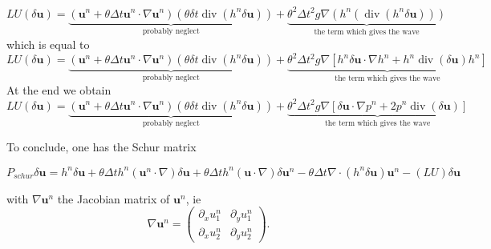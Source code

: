 \documentclass[a4paper, 11pt]{article}
\begin{document}
\begin{equation*}
LU(\delta \boldsymbol{u})=\underbrace{\left(\boldsymbol{u}^n+\theta \Delta t \boldsymbol{u}^n\cdot \nabla \boldsymbol{u}^n \right)\left(\theta \delta t \operatorname{div}(h^n \delta \boldsymbol{u})\right)}_\textrm{probably neglect}
+\underbrace{\theta^2 \Delta t^2 g\nabla\left( h^n\left(\operatorname{div}(h^n\delta  \boldsymbol{u})\right)\right)}_\textrm{the term which gives the wave}
\end{equation*}
which is equal to
\begin{equation*}
LU(\delta \boldsymbol{u})=\underbrace{\left(\boldsymbol{u}^n+\theta \Delta t \boldsymbol{u}^n\cdot \nabla \boldsymbol{u}^n \right)\left(\theta \delta t \operatorname{div}(h^n \delta \boldsymbol{u})\right)}_\textrm{probably neglect}
+\underbrace{\theta^2 \Delta t^2 g\nabla\left[ h^n \delta \boldsymbol{u}\cdot \nabla h^n + h^n \operatorname{div}(\delta \boldsymbol{u})h^n \right]}_\textrm{the term which gives the wave}
\end{equation*}
At the end we obtain
\begin{equation*}
LU(\delta \boldsymbol{u})=\underbrace{\left(\boldsymbol{u}^n+\theta \Delta t \boldsymbol{u}^n\cdot \nabla \boldsymbol{u}^n \right)\left(\theta \delta t \operatorname{div}(h^n \delta \boldsymbol{u})\right)}_\textrm{probably neglect}
+\underbrace{\theta^2 \Delta t^2 g\nabla\left[ \delta \boldsymbol{u}\cdot \nabla p^n + 2p^n \operatorname{div}(\delta \boldsymbol{u}) \right]}_\textrm{the term which gives the wave}
\end{equation*}

To conclude, one has the Schur matrix 
\begin{small}
\begin{equation*}
P_{schur}\delta \boldsymbol{u}=h^n \delta \boldsymbol{u}+\theta\Delta th^n\left(\boldsymbol{u}^n\cdot\nabla\right)\delta \boldsymbol{u}+\theta\Delta th^n\left(\boldsymbol{u} \cdot\nabla\right)\delta \boldsymbol{u}^n-\theta\Delta t\nabla\cdot\left(h^n \delta \boldsymbol{u}\right)\boldsymbol{u}^n-(LU)\delta \boldsymbol{u}
\end{equation*}
\end{small}
with $\nabla\boldsymbol{u}^n$ the Jacobian matrix of $\boldsymbol{u}^n$, ie
\begin{equation*}
\nabla\boldsymbol{u}^n=
\begin{pmatrix}
\partial_x u_1^n &\partial_y u_1^n\\ \partial_x u_2^n &\partial_y u_2^n
\end{pmatrix}.
\end{equation*}
\end{document}
